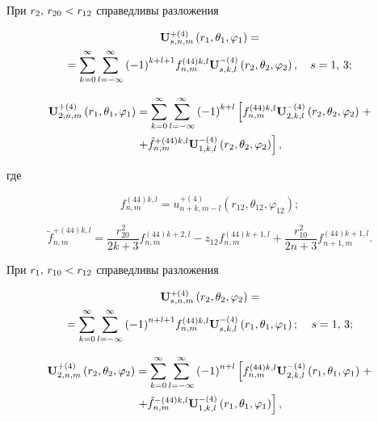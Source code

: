 \begin{theorem}
При ${r_2},{\mkern 1mu} {\kern 1pt} {r_{20}} < {r_{12}}$ справедливы разложения

\begin{multline}\label{eq:1:95}
{\bf{U}}_{s,n,m}^{ + (4)}\left( {{r_1},{\theta _1},{\varphi _1}} \right) = \\
= \sum\limits_{k = 0}^\infty  {\sum\limits_{l =  - \infty }^\infty  {{{( - 1)}^{k + l + 1}}} } f_{n,m}^{(44)k,l}{\bf{U}}_{s,k,l}^{ - (4)}\left( {{r_2},{\theta _2},{\varphi _2}} \right), \quad s = 1,\,3;
\end{multline}

\begin{multline}\label{eq:1:96}
{\bf{U}}_{2,n,m}^{ + (4)}\left( {{r_1},{\theta _1},{\varphi _1}} \right) = \sum\limits_{k = 0}^\infty  {\sum\limits_{l =  - \infty }^\infty  {{{( - 1)}^{k + l}}} } \left[ {f_{n,m}^{(44)k,l}{\bf{U}}_{2,k,l}^{ - (4)}\left( {{r_2},{\theta _2},{\varphi _2}} \right)} \right. + \\
\left. { + \tilde f_{n,m}^{ + (44)k,l}{\bf{U}}_{1,k,l}^{ - (4)}\left( {{r_2},{\theta _2},{\varphi _2}} \right)} \right],
\end{multline}

\noindent где

\begin{equation}\label{eq:1:97}
f_{n,m}^{(44)k,l} = u_{n + k,m - l}^{ + (4)}\left( {{r_{12}},{\theta _{12}},{\varphi _{12}}} \right);
\end{equation}

\begin{equation}\label{eq:1:98}
\tilde f_{n,m}^{ + (44)k,l} = \frac{{r_{20}^2}}{{2k + 3}}f_{n,m}^{(44)k + 2,l} - {z_{12}}f_{n,m}^{(44)k + 1,l} + \frac{{r_{10}^2}}{{2n + 3}}f_{n + 1,m}^{(44)k + 1,l}.
\end{equation}

При ${r_1},{\mkern 1mu} {\kern 1pt} {r_{10}} < {r_{12}}$ справедливы разложения

\begin{multline}\label{eq:1:99}
{\bf{U}}_{s,n,m}^{ + (4)}\left( {{r_2},{\theta _2},{\varphi _2}} \right) = \\
= \sum\limits_{k = 0}^\infty  {\sum\limits_{l =  - \infty }^\infty  {{{( - 1)}^{n + l + 1}}} } f_{n,m}^{(44)k,l}{\bf{U}}_{s,k,l}^{ - (4)}\left( {{r_1},{\theta _1},{\varphi _1}} \right); \quad {\kern 1pt} s = 1,{\mkern 1mu} {\kern 1pt} 3;
\end{multline}

\begin{multline}\label{eq:1:100}
{\bf{U}}_{2,n,m}^{ + (4)}\left( {{r_2},{\theta _2},{\varphi _2}} \right) = \sum\limits_{k = 0}^\infty  {\sum\limits_{l =  - \infty }^\infty  {{{( - 1)}^{n + l}}} } \left[ {f_{n,m}^{(44)k,l}{\bf{U}}_{2,k,l}^{ - (4)}\left( {{r_1},{\theta _1},{\varphi _1}} \right)} \right. + \\
\left. { + \tilde f_{n,m}^{ - (44)k,l}{\bf{U}}_{1,k,l}^{ - (4)}\left( {{r_1},{\theta _1},{\varphi _1}} \right)} \right],
\end{multline}


\end{theorem}
